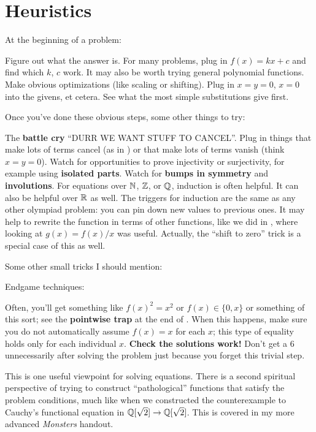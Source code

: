 \documentclass[11pt]{scrartcl}
\begin{document}
\section{Heuristics}
At the beginning of a problem:
\begin{itemize}
  \ii Figure out what the answer is.
  For many problems, plug in $f(x) = kx+c$ and find which $k$, $c$ work.
  It may also be worth trying general polynomial functions.
  \ii Make obvious optimizations (like scaling or shifting).
  \ii Plug in $x=y=0$, $x=0$ into the givens, et cetera.
  See what the most simple substitutions give first.
\end{itemize}
Once you've done these obvious steps, some other things to try:
\begin{itemize}
  \ii The \textbf{battle cry} ``DURR WE WANT STUFF TO CANCEL''.
  Plug in things that make lots of terms cancel (as in )
  or that make lots of terms vanish (think $x=y=0$).
  \ii Watch for opportunities to prove injectivity or surjectivity,
  for example using \textbf{isolated parts}.
  \ii Watch for \textbf{bumps in symmetry} and \textbf{involutions}.
  \ii For equations over $\mathbb N$, $\mathbb Z$, or $\mathbb Q$, induction is often helpful.
  It can also be helpful over $\mathbb R$ as well.
  The triggers for induction are the same as any other olympiad problem:
  you can pin down new values to previous ones.
  \ii It may help to rewrite the function in terms of other functions,
  like we did in , where looking at $g(x) = f(x) / x$ was useful.
  Actually, the ``shift to zero'' trick is a special case of this as well.
\end{itemize}
Some other small tricks I should mention:

Endgame techniques:
\begin{itemize}
  \ii Often, you'll get something like $f(x)^2 = x^2$
  or $f(x) \in \{0,x\}$ or something of this sort;
  see the \textbf{pointwise trap} at the end of .
  When this happens, make sure you do not automatically assume $f(x) = x$ for each $x$;
  this type of equality holds only for each individual $x$.
  \ii \textbf{Check the solutions work!}
  Don't get a $6$ unnecessarily after solving the problem
  just because you forget this trivial step.
\end{itemize}

This is one useful viewpoint for solving equations.
There is a second spiritual perspective of trying to construct ``pathological'' functions
that satisfy the problem conditions, much like when we constructed the counterexample
to Cauchy's functional equation in $\mathbb Q[\sqrt2] \to \mathbb Q[\sqrt2]$.
This is covered in my more advanced \emph{Monsters} handout.
\end{document}
